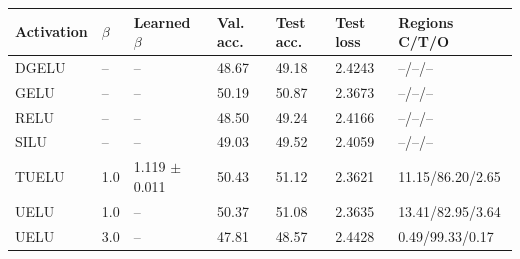 \begin{tabular}{lllllll}
\toprule
Activation & $\beta$ & Learned $\beta$ & Val. acc. & Test acc. & Test loss & Regions C/T/O \\
\midrule
DGELU & -- & -- & 48.67 & 49.18 & 2.4243 & --/--/-- \\
GELU & -- & -- & 50.19 & 50.87 & 2.3673 & --/--/-- \\
RELU & -- & -- & 48.50 & 49.24 & 2.4166 & --/--/-- \\
SILU & -- & -- & 49.03 & 49.52 & 2.4059 & --/--/-- \\
TUELU & 1.0 & 1.119 $\pm$ 0.011 & 50.43 & 51.12 & 2.3621 & 11.15/86.20/2.65 \\
UELU & 1.0 & -- & 50.37 & 51.08 & 2.3635 & 13.41/82.95/3.64 \\
UELU & 3.0 & -- & 47.81 & 48.57 & 2.4428 & 0.49/99.33/0.17 \\
\bottomrule
\end{tabular}
